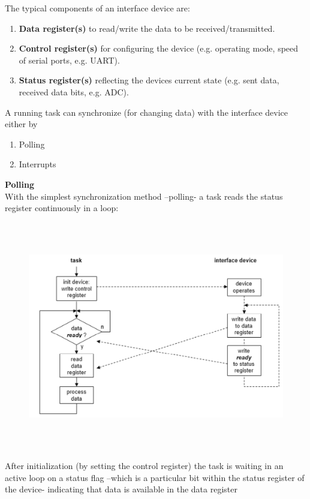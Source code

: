 The typical components of an interface device are:

\begin{enumerate}
	\item  \textbf{Data register(s)} to read/write the data to be received/transmitted.
	\item  \textbf{Control register(s)} for configuring the device (e.g. operating mode, speed of serial ports, e.g. UART).
	\item  \textbf{Status register(s)} reflecting the devices current state (e.g. sent data, received data bits, e.g. ADC).
\end{enumerate}

A running task can synchronize  (for changing data) with the interface device either by

\begin{enumerate}
	\item  Polling
	\item  Interrupts
\end{enumerate}

{\rot\bf Polling}\\

With the simplest synchronization method --polling- a task reads the status register continuously in a loop:

 	\begin{figure}[h]
    \centering
    \includegraphics[width=14cm, height=10cm]{Images/image123.png}
    \label{fig:Fig }
    \end{figure}

After initialization (by setting the control register) the task is waiting in an active loop on a status flag --which is a particular bit within the status register of the device- indicating that  data is available in the data register  

